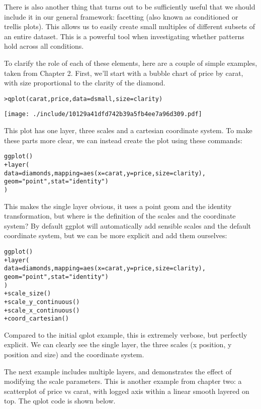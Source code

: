 There is also another thing that turns out to be sufficiently useful that we should include it in our general framework: facetting (also known as conditioned or trellis plots). This allows us to easily create small multiples of different subsets of an entire dataset. This is a powerful tool when investigating whether patterns hold across all conditions.

To clarify the role of each of these elements, here are a couple of simple examples, taken from Chapter 2.  First, we'll start with a bubble chart of price by carat, with size proportional to the clarity of the diamond.

\begin{alltt}
> qplot(carat, price, data = dsmall, size = clarity)
\end{alltt}
\texttt{[image: ./include/10129a41dfd742b39a5fb4ee7a96d309.pdf]}
\begin{alltt}

\end{alltt}

This plot has one layer, three scales and a cartesian coordinate system.  To make these parts more clear, we can instead create the plot using these commands:

\begin{alltt}
ggplot()
+ layer(
    data=diamonds, mapping=aes(x=carat, y=price, size=clarity),
    geom = "point", stat = "identity")
  )
\end{alltt}

This makes the single layer obvious, it uses a point geom and the identity transformation, but where is the definition of the scales and the coordinate system?  By default ggplot will automatically add sensible scales and the default coordinate system, but we can be more explicit and add them ourselves:

\begin{alltt}
ggplot() 
+ layer(
    data=diamonds, mapping=aes(x=carat, y=price, size=clarity),
    geom = "point", stat = "identity")
  )
+ scale_size()
+ scale_y_continuous()
+ scale_x_continuous()
+ coord_cartesian()
\end{alltt}

Compared to the initial qplot example, this is extremely verbose, but perfectly explicit.  We  can clearly see the single layer, the three scales (x position, y position and size) and the coordinate system.  

The next example includes multiple layers, and demonstrates the effect of modifying the scale parameters.  This is another example from chapter two: a scatterplot of price vs carat, with logged axis within a linear smooth layered on top.  The qplot code is shown below.

